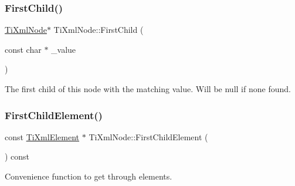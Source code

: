 \subsubsection{\texorpdfstring{First\+Child()}{FirstChild()}\hspace{0.1cm}{\footnotesize\ttfamily [4/4]}}
{\footnotesize\ttfamily \hyperlink{class_ti_xml_node}{Ti\+Xml\+Node}$\ast$ Ti\+Xml\+Node\+::\+First\+Child (\begin{DoxyParamCaption}\item[{const char $\ast$}]{\+\_\+value }\end{DoxyParamCaption})\hspace{0.3cm}{\ttfamily [inline]}}



The first child of this node with the matching \textquotesingle{}value\textquotesingle{}. Will be null if none found. 

\mbox{\label{class_ti_xml_node_a12c973e1da9e90a178924b8ea5a5f4d1}} 
\subsubsection{\texorpdfstring{First\+Child\+Element()}{FirstChildElement()}\hspace{0.1cm}{\footnotesize\ttfamily [1/4]}}
{\footnotesize\ttfamily const \hyperlink{class_ti_xml_element}{Ti\+Xml\+Element} $\ast$ Ti\+Xml\+Node\+::\+First\+Child\+Element (\begin{DoxyParamCaption}{ }\end{DoxyParamCaption}) const}



Convenience function to get through elements. 

